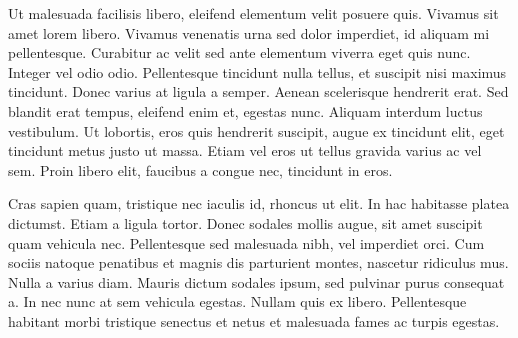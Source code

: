 \documentclass[10pt,a4paper]{article}
\begin{document}
Ut malesuada facilisis libero, eleifend elementum velit posuere quis. Vivamus sit amet lorem libero. Vivamus venenatis urna sed dolor imperdiet, id aliquam mi pellentesque. Curabitur ac velit sed ante elementum viverra eget quis nunc. Integer vel odio odio. Pellentesque tincidunt nulla tellus, et suscipit nisi maximus tincidunt. Donec varius at ligula a semper. Aenean scelerisque hendrerit erat. Sed blandit erat tempus, eleifend enim et, egestas nunc. Aliquam interdum luctus vestibulum. Ut lobortis, eros quis hendrerit suscipit, augue ex tincidunt elit, eget tincidunt metus justo ut massa. Etiam vel eros ut tellus gravida varius ac vel sem. Proin libero elit, faucibus a congue nec, tincidunt in eros.

Cras sapien quam, tristique nec iaculis id, rhoncus ut elit. In hac habitasse platea dictumst. Etiam a ligula tortor. Donec sodales mollis augue, sit amet suscipit quam vehicula nec. Pellentesque sed malesuada nibh, vel imperdiet orci. Cum sociis natoque penatibus et magnis dis parturient montes, nascetur ridiculus mus. Nulla a varius diam. Mauris dictum sodales ipsum, sed pulvinar purus consequat a. In nec nunc at sem vehicula egestas. Nullam quis ex libero. Pellentesque habitant morbi tristique senectus et netus et malesuada fames ac turpis egestas.

\cite{*}



\end{document}
